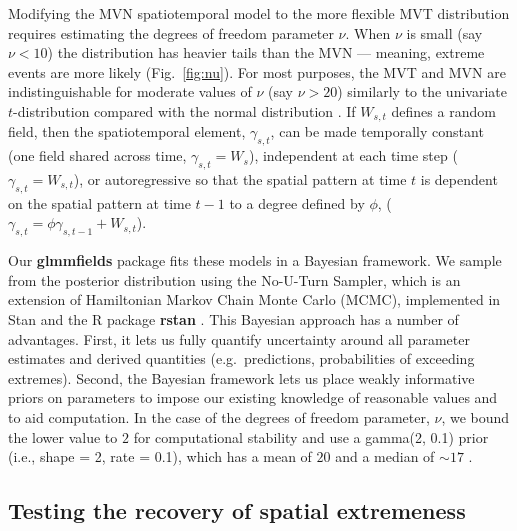 \documentclass[12pt,english]{article}
\begin{document}
\begin{spacing}{1.9}
Modifying the MVN spatiotemporal model to the more flexible MVT distribution
requires estimating the degrees of freedom parameter $\nu$. When $\nu$ is small
(say $\nu < 10$) the distribution has heavier tails than the MVN
--- meaning, extreme events are more likely (Fig.~\ref{fig:nu}). For most
purposes, the MVT and MVN are indistinguishable for moderate values of $\nu$
(say $\nu > 20$) similarly to the univariate $t$-distribution compared with the
normal distribution \citep[e.g.][]{anderson2017}. If $W_{s,t}$
defines a random field, then the spatiotemporal element, $\gamma_{s,t}$, can be
made temporally constant (one field shared across time, $\gamma_{s,t} = W_{s}$),
independent at each time step ($\gamma_{s,t} = W_{s,t}$), or autoregressive so
that the spatial pattern at time $t$ is dependent on the spatial pattern at time
$t-1$ to a degree defined by $\phi$, ($\gamma_{s,t} = \phi \gamma_{s,t-1} +
W_{s,t}$).

Our \textbf{glmmfields} package fits these models in a Bayesian framework. We
sample from the posterior distribution using the No-U-Turn Sampler, which is an
extension of Hamiltonian Markov Chain Monte Carlo (MCMC), implemented in Stan
\citep{standevelopmentteam2016a, carpenter2017} and the R package \textbf{rstan}
\citep{standevelopmentteam2016}. This Bayesian approach has a number of
advantages. First, it lets us fully quantify uncertainty around all parameter
estimates and derived quantities (e.g.\ predictions, probabilities of exceeding
extremes). Second, the Bayesian framework lets us place weakly informative
priors on parameters to impose our existing knowledge of reasonable values and
to aid computation. In the case of the degrees of freedom parameter, $\nu$, we
bound the lower value to $2$ for computational stability and use a gamma(2, 0.1)
prior (i.e., shape = 2, rate = 0.1), which has a mean of $20$ and a median of
$\sim 17$ \citep{juarez2010}.

\subsection{Testing the recovery of spatial extremeness}
\label{sec:testing-recovery}


\end{spacing}
\end{document}

